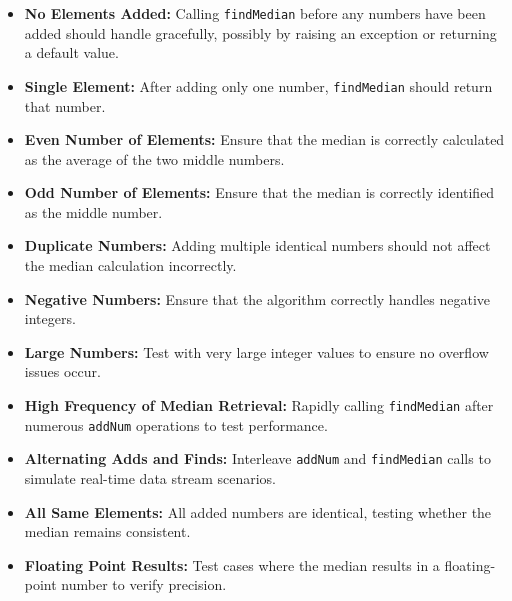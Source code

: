 \begin{itemize}
    \item \textbf{No Elements Added:} Calling \texttt{findMedian} before any numbers have been added should handle gracefully, possibly by raising an exception or returning a default value.
    
    \item \textbf{Single Element:} After adding only one number, \texttt{findMedian} should return that number.
    
    \item \textbf{Even Number of Elements:} Ensure that the median is correctly calculated as the average of the two middle numbers.
    
    \item \textbf{Odd Number of Elements:} Ensure that the median is correctly identified as the middle number.
    
    \item \textbf{Duplicate Numbers:} Adding multiple identical numbers should not affect the median calculation incorrectly.
    
    \item \textbf{Negative Numbers:} Ensure that the algorithm correctly handles negative integers.
    
    \item \textbf{Large Numbers:} Test with very large integer values to ensure no overflow issues occur.
    
    \item \textbf{High Frequency of Median Retrieval:} Rapidly calling \texttt{findMedian} after numerous \texttt{addNum} operations to test performance.
    
    \item \textbf{Alternating Adds and Finds:} Interleave \texttt{addNum} and \texttt{findMedian} calls to simulate real-time data stream scenarios.
    
    \item \textbf{All Same Elements:} All added numbers are identical, testing whether the median remains consistent.
    
    \item \textbf{Floating Point Results:} Test cases where the median results in a floating-point number to verify precision.
    

\end{itemize}
